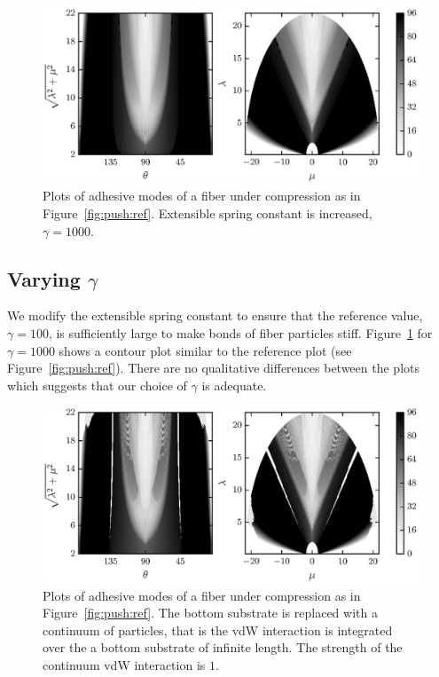 	\begin{figure}[t]
		\begin{center}
			\includegraphics{./fig/ch3/push/g1000/grid.eps}
		\end{center}		
		\caption{Plots of adhesive modes of a fiber under compression as in Figure~\ref{fig:push:ref}. Extensible spring constant is increased, $\gamma=1000$.
		\label{fig:push:g1000}}
	\end{figure}	

\subsection{Varying $\gamma$}

We modify the extensible spring constant to ensure that the reference value, $\gamma=100$, is sufficiently large to make bonds of fiber particles stiff. Figure~\ref{fig:push:g1000} for $\gamma=1000$ shows a contour plot similar to the reference plot (see Figure~\ref{fig:push:ref}). There are no qualitative differences between the plots which suggests that our choice of $\gamma$ is adequate.

	\begin{figure}[t]
		\begin{center}
			\includegraphics{./fig/ch3/push/p1/grid.eps}
		\end{center}		
		\caption{Plots of adhesive modes of a fiber under compression as in Figure~\ref{fig:push:ref}. The bottom substrate is replaced with a continuum of particles, that is the vdW interaction is integrated over the a bottom substrate of infinite length. The strength of the continuum vdW interaction is $1$.
		\label{fig:push:p1}}
	\end{figure}

